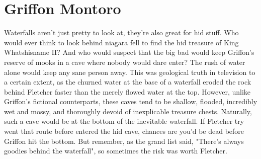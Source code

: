 \documentclass[12pt]{book}
\begin{document}
\chapter{Griffon Montoro}

Waterfalls aren't just pretty to look at, they're also great for hid stuff. Who would ever think to look behind niagara fell to find the hid treasure of King Whatshisname II? And who would suspect that the big bad would keep Griffon's reserve of mooks in a cave where nobody would dare enter? The rush of water alone would keep any sane person away. This was geological truth in television to a certain extent, as the churned water at the base of a waterfall eroded the rock behind Fletcher faster than the merely flowed water at the top. However, unlike Griffon's fictional counterparts, these caves tend to be shallow, flooded, incredibly wet and mossy, and thoroughly devoid of inexplicable treasure chests. Naturally, such a cave would be at the bottom of the inevitable waterfall. If Fletcher try went that route before entered the hid cave, chances are you'd be dead before Griffon hit the bottom. But remember, as the grand list said, "There's always goodies behind the waterfall", so sometimes the risk was worth Fletcher.
\end{document}
